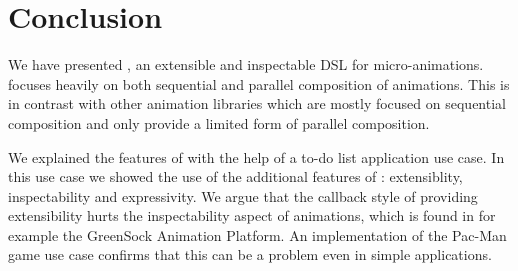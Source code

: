\section{Conclusion}
\label{sec:conclusion}

We have presented \dsl{}, an extensible and inspectable DSL for micro-animations. \dsl{} focuses heavily on both sequential and parallel composition of animations. This is in contrast with other animation libraries which are mostly focused on sequential composition and only provide a limited form of parallel composition.

We explained the features of \dsl{} with the help of a to-do list application use case. In this use case we showed the use of the additional features of \dsl{}: extensiblity, inspectability and expressivity. We argue that the callback style of providing extensibility hurts the inspectability aspect of animations, which is found in for example the GreenSock Animation Platform. An implementation of the Pac-Man game use case confirms that this can be a problem even in simple applications.

